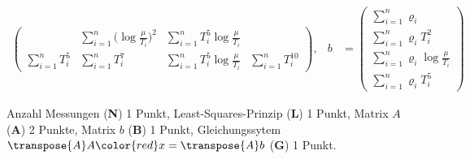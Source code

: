 \begin{loesung}
\begin{align*}
\begin{pmatrix}
		&\displaystyle \sum_{i=1}^n \biggl(\log\frac{\mu}{T_i}\biggr)^2
			&\displaystyle \sum_{i=1}^n T_i^5\log\frac{\mu}{T_i}
\\
\displaystyle\sum_{i=1}^n T_i^5 
	&\displaystyle \sum_{i=1}^n T_i^7
		&\displaystyle \sum_{i=1}^n T_i^5\log\frac{\mu}{T_i}
			&\displaystyle \sum_{i=1}^nT_i^{10}
\end{pmatrix},
&
b
&=
\begin{pmatrix}
\displaystyle\sum_{i=1}^n \varrho_i \\
\displaystyle\sum_{i=1}^n \varrho_i T_i^2 \\
\displaystyle\sum_{i=1}^n \varrho_i \log\frac{\mu}{T_i} \\
\displaystyle\sum_{i=1}^n \varrho_i T_i^5
\end{pmatrix}
\end{align*}
\end{loesung}

\begin{bewertung}
Anzahl Messungen ({\bf N}) 1 Punkt,
Least-Squares-Prinzip ({\bf L}) 1 Punkt,
Matrix $A$ ({\bf A}) 2 Punkte,
Matrix $b$ ({\bf B}) 1 Punkt,
Gleichungssytem $\transpose{A}A{\color{red}}x=\transpose{A}b$ ({\bf G}) 1 Punkt.
\end{bewertung}
